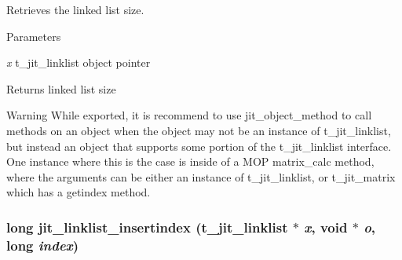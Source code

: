 Retrieves the linked list size. 
\begin{DoxyParams}{Parameters}
\item[{\em x}]t\_\-jit\_\-linklist object pointer\end{DoxyParams}
\begin{DoxyReturn}{Returns}
linked list size
\end{DoxyReturn}
\begin{DoxyWarning}{Warning}
While exported, it is recommend to use jit\_\-object\_\-method to call methods on an object when the object may not be an instance of t\_\-jit\_\-linklist, but instead an object that supports some portion of the t\_\-jit\_\-linklist interface. One instance where this is the case is inside of a MOP matrix\_\-calc method, where the arguments can be either an instance of t\_\-jit\_\-linklist, or t\_\-jit\_\-matrix which has a getindex method. 
\end{DoxyWarning}
\hypertarget{group__linklistmod_gabd11461161921960afdceb120d039a04}{
\subsubsection[{jit\_\-linklist\_\-insertindex}]{\setlength{\rightskip}{0pt plus 5cm}long jit\_\-linklist\_\-insertindex (t\_\-jit\_\-linklist $\ast$ {\em x}, \/  void $\ast$ {\em o}, \/  long {\em index})}}
\label{group__linklistmod_gabd11461161921960afdceb120d039a04}


